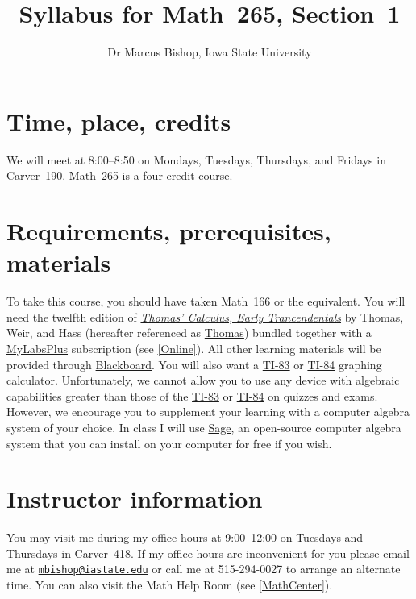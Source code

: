 \documentclass[11pt]{article}
\title{Syllabus for Math~265, Section~1}
\author{Dr Marcus Bishop, Iowa State University}
\begin{document}
\maketitle

\section{Time, place, credits}\label{Time}
We will meet at 8:00--8:50
on Mondays, Tuesdays, Thursdays, and Fridays
in Carver~190.
Math~265 is a four credit course.

\section{Requirements, prerequisites, materials}\label{Require}
To take this course, you should have taken Math~166
or the equivalent. You will need the twelfth edition of 
\href{http://wps.aw.com/aw_thomas_calculus_series}
{\em Thomas' Calculus, Early Trancendentals}
by Thomas, Weir, and Hass (hereafter referenced as
\href{http://wps.aw.com/aw_thomas_calculus_series}{Thomas})
bundled together with a
\href{http://iastate.mylabsplus.com}{MyLabsPlus} subscription
(see \autoref{Online}).
All other learning materials will be provided through
\href{https://bb.its.iastate.edu}{Blackboard}.
You will also want a 
\href{http://en.wikipedia.org/wiki/TI-83}{TI-83} or
\href{http://en.wikipedia.org/wiki/TI-84}{TI-84}
graphing calculator. Unfortunately, we cannot allow you to use
any device with algebraic capabilities greater than those of the
\href{http://en.wikipedia.org/wiki/TI-83}{TI-83} or
\href{http://en.wikipedia.org/wiki/TI-84}{TI-84}
on quizzes and exams. However, we encourage
you to supplement your learning with a computer algebra system
of your choice.
In class I will use \href{http://www.sagemath.org}{\sf Sage},
an open-source computer algebra system that you can install on your
computer for free if you wish.

\section{Instructor information} You may visit me during my office 
hours at 9:00--12:00 on Tuesdays and Thursdays
in Carver~418. If my office hours are inconvenient for you
please email me at 
\href{mailto:mbishop@iastate.edu}{\tt mbishop@iastate.edu} or call me at 
515-294-0027 to arrange an alternate time.
You can also visit the Math Help Room (see \autoref{MathCenter}).
\end{document}
